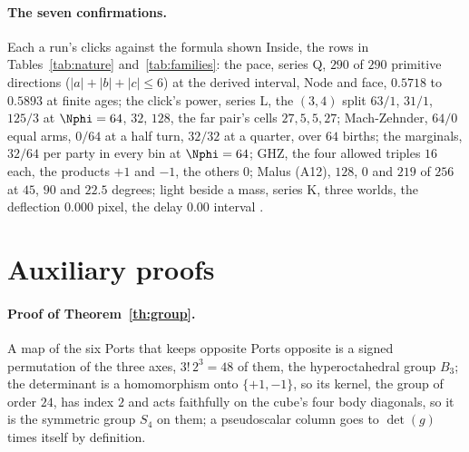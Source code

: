\paragraph{The seven confirmations.} {\footnotesize Each a run's clicks against the formula shown Inside, the rows in Tables~\ref{tab:nature} and~\ref{tab:families}: the pace, series Q, $290$ of $290$ primitive directions ($|a| + |b| + |c| \le 6$) at the derived interval, Node and face, $0.5718$ to $0.5893$ at finite ages; the click's power, series L, the $(3, 4)$ split $63/1$, $31/1$, $125/3$ at $\Nphi = 64$, $32$, $128$, the far pair's cells $27, 5, 5, 27$; Mach-Zehnder, $64/0$ equal arms, $0/64$ at a half turn, $32/32$ at a quarter, over $64$ births; the marginals, $32/64$ per party in every bin at $\Nphi = 64$; GHZ, the four allowed triples $16$ each, the products $+1$ and $-1$, the others $0$; Malus (A12), $128$, $0$ and $219$ of $256$ at $45$, $90$ and $22.5$ degrees; light beside a mass, series K, three worlds, the deflection $0.000$ pixel, the delay $0.00$ interval \cite{register,replications}.} 

\section{Auxiliary proofs}\label{app:proofs}

\paragraph{Proof of Theorem~\ref{th:group}.} A map of the six Ports that keeps opposite Ports opposite is a signed permutation of the three axes, $3!\,2^3 = 48$ of them, the hyperoctahedral group $B_3$; the determinant is a homomorphism onto $\{+1, -1\}$, so its kernel, the group of order $24$, has index $2$ and acts faithfully on the cube's four body diagonals, so it is the symmetric group $S_4$ on them; a pseudoscalar column goes to $\det(g)$ times itself by definition. 

